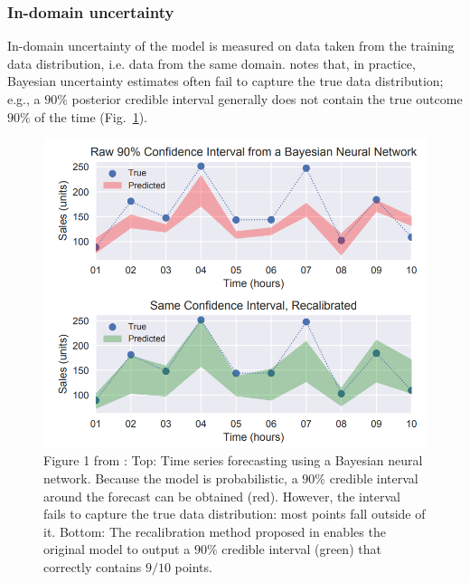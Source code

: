 \subsubsection{In-domain uncertainty}
In-domain uncertainty of the model is measured on data taken from the training data distribution, i.e. data from the same domain.
\textcite{kuleshov2018accurate} notes that, in practice, Bayesian uncertainty estimates often fail to capture the true data distribution; e.g., a $90 \%$ posterior credible interval generally does not contain the true outcome $90 \%$ of the time (Fig.~\ref{fig:calib}).
\begin{figure}
	\centering
	\includegraphics[width=0.7\linewidth]{./Figures/calib.png}
	\caption{Figure 1 from \textcite{kuleshov2018accurate}: 
	Top: Time series forecasting using a Bayesian neural network.
	Because the model is probabilistic, a $90\%$ credible interval around the forecast can be obtained (red). 
	However, the interval fails to capture the true data distribution: most points fall outside of it. 
	Bottom: The recalibration method proposed in \textcite{kuleshov2018accurate} enables the original model to output a $90\%$ credible interval (green) that correctly contains $9/10$ points.}
	\label{fig:calib}
\end{figure} 

